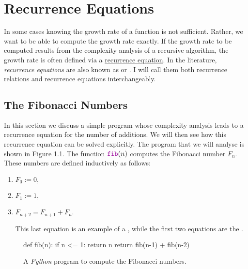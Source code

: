 \chapter{Recurrence Equations}
In some cases knowing the growth rate of a function is not sufficient.  Rather, we want to be able to compute
the growth rate exactly.  If the growth rate to be computed results from the complexity analysis of a recursive
algorithm, the growth rate is often defined via a
\href{https://en.wikipedia.org/wiki/Recurrence_relation}{recurrence equation}.  In the literature,
\emph{recurrence equations} are also known as  or
.  I will call them both recurrence relations and
recurrence equations interchangeably.

\section{The Fibonacci Numbers}
In this section we discuss a simple program whose complexity analysis
leads to a recurrence equation for the  
number of additions.  We will then see how this recurrence equation can be solved explicitly.  The program that
we will analyse is shown in Figure \ref{fig:Fibonacci.ipynb}.  The function $\mytt{fib}(n)$ computes the
\href{https://en.wikipedia.org/wiki/Fibonacci_number}{Fibonacci number}  $F_n$.  These
numbers are defined inductively as follows:
\begin{enumerate}
\item $F_0 := 0$,
\item $F_1 := 1$, 
\item $F_{n+2} = F_{n+1} + F_n$.

  This last equation is an example of a , while the first two equations are the
  . 
\end{enumerate}

\begin{figure}[!h]
  \centering
\begin{python3code} 
    def fib(n):
        if n <= 1:
            return n
        return fib(n-1) + fib(n-2)
\end{python3code}
\vspace*{-0.7cm}
  \caption{A \textsl{Python} program to compute the Fibonacci numbers.}
  \label{fig:Fibonacci.ipynb}
\end{figure} 

